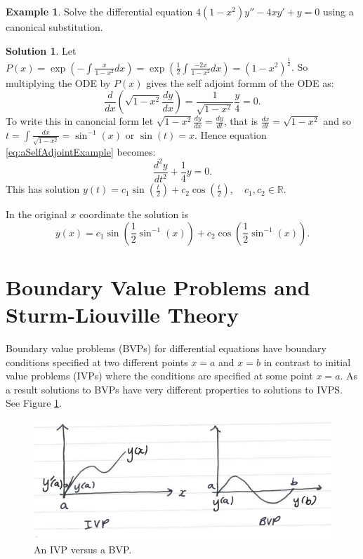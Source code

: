 \documentclass{article}
\theoremstyle{plain}
\theoremstyle{definition}
\newtheorem{exmp}{Example}[section]
\newtheorem*{sol}{Solution}
\numberwithin{equation}{section}
\begin{document}
\begin{tcolorbox}
    \begin{exmp}
        Solve the differential equation $4(1-x^2)y'' - 4xy' + y = 0$ using a canonical substitution.
    \end{exmp}
    \begin{sol}
        Let $P(x) = \exp\left(-\int\frac{x}{1-x^2} dx\right) = \exp\left( \frac{1}{2} \int \frac{-2x}{1-x^2} dx \right) = (1-x^2)^{\frac{1}{2}}$.
        So multiplying the ODE by $P(x)$ gives the self adjoint formm of the ODE as:\
        \begin{equation}\label{eq:aSelfAdjointExample}
            \frac{d}{dx}\left( \sqrt{1-x^2} \frac{dy}{dx} \right) = \frac{1}{\sqrt{1-x^2}}\frac{y}{4} = 0.
        \end{equation}
        To write this in canoncial form let $\sqrt{1-x^2}\frac{dy}{dx} = \frac{dy}{dt}$, that is $\frac{dx}{dt} = \sqrt{1-x^2}$ and so $t=\int \frac{dx}{\sqrt{1-x^2}} = \sin^{-1}(x)$ or $\sin(t) = x$. Hence equation \eqref{eq:aSelfAdjointExample} becomes:
        \[\frac{d^2y}{dt^2} + \frac{1}{4}y = 0.\]
        This has solution $y(t) = c_1\sin\left(\frac{t}{2}\right) + c_2 \cos \left( \frac{t}{2} \right), \quad c_1,c_2 \in \mathbb{R}$.

        In the original $x$ coordinate the solution is
        \[ y(x) = c_1\sin \left(\frac{1}{2} \sin^{-1}(x) \right) + c_2 \cos\left(\frac{1}{2}\sin^{-1}(x)\right). \]
    \end{sol}
\end{tcolorbox}

\pagebreak
\section{Boundary Value Problems and Sturm-Liouville Theory}

Boundary value problems (BVPs) for differential equations have boundary conditions specified at two different points $x=a$ and $x=b$ in contrast to initial value problems (IVPs) where the conditions are specified at some point $x=a$. As a result solutions to BVPs have very different properties to solutions to IVPS. See Figure \ref{fig:IVPvsBVP}.

\begin{figure}[h]
    \centering
    \includegraphics{images/IVPvsBVP.png}
    \caption{An IVP versus a BVP.}
    \label{fig:IVPvsBVP}
\end{figure}
\end{document}
